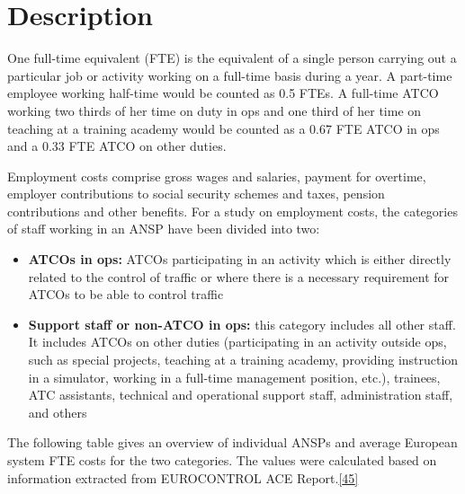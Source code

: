 \documentclass[
  11pt,
  a4paper,
]{book}
\begin{document}
\hypertarget{description-12}{%
\section{Description}\label{description-12}}

One full-time equivalent (FTE) is the equivalent of a single person
carrying out a particular job or activity working on a full-time basis
during a year. A part-time employee working half-time would be counted
as 0.5 FTEs. A full-time ATCO working two thirds of her time on duty in
ops and one third of her time on teaching at a training academy would be
counted as a 0.67 FTE ATCO in ops and a 0.33 FTE ATCO on other duties.

Employment costs comprise gross wages and salaries, payment for
overtime, employer contributions to social security schemes and taxes,
pension contributions and other benefits. For a study on employment
costs, the categories of staff working in an ANSP have been divided into
two:

\begin{itemize}
\item
  \textbf{ATCOs in ops:} ATCOs participating in an activity which is
  either directly related to the control of traffic or where there is a
  necessary requirement for ATCOs to be able to control traffic
\item
  \textbf{Support staff or non-ATCO in ops:} this category includes all
  other staff. It includes ATCOs on other duties (participating in an
  activity outside ops, such as special projects, teaching at a training
  academy, providing instruction in a simulator, working in a full-time
  management position, etc.), trainees, ATC assistants, technical and
  operational support staff, administration staff, and others
\end{itemize}

The following table gives an overview of individual ANSPs and average
European system FTE costs for the two categories. The values were
calculated based on information extracted from EUROCONTROL ACE
Report.\protect\hyperlink{ref-ace2020}{{[}45{]}}
\end{document}
